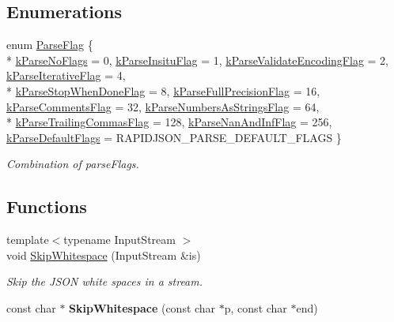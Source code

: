 \subsection*{Enumerations}
\begin{DoxyCompactItemize}
\item 
enum \hyperlink{a00683_ab7be7dabe6ffcba60fad441505583450}{Parse\+Flag} \{ \\*
\hyperlink{a00683_ab7be7dabe6ffcba60fad441505583450a1af603dc5f65bb815316589e782bc71a}{k\+Parse\+No\+Flags} = 0, 
\hyperlink{a00683_ab7be7dabe6ffcba60fad441505583450a13188bd483b4df0b6582bebe2aeb5b01}{k\+Parse\+Insitu\+Flag} = 1, 
\hyperlink{a00683_ab7be7dabe6ffcba60fad441505583450a9b3baa16346575d2dc072b23a88e1928}{k\+Parse\+Validate\+Encoding\+Flag} = 2, 
\hyperlink{a00683_ab7be7dabe6ffcba60fad441505583450aadb14f5a3b6b33e28055e913a2eae5e9}{k\+Parse\+Iterative\+Flag} = 4, 
\\*
\hyperlink{a00683_ab7be7dabe6ffcba60fad441505583450af77d115d3bbed0a448b6b335f3b93b36}{k\+Parse\+Stop\+When\+Done\+Flag} = 8, 
\hyperlink{a00683_ab7be7dabe6ffcba60fad441505583450a057fbeacafb16bb7d24c9998262cae46}{k\+Parse\+Full\+Precision\+Flag} = 16, 
\hyperlink{a00683_ab7be7dabe6ffcba60fad441505583450a245d1b6af730f47f0e7bd27078f5e8c1}{k\+Parse\+Comments\+Flag} = 32, 
\hyperlink{a00683_ab7be7dabe6ffcba60fad441505583450aa951ab03a51b32b60164436bc280cf01}{k\+Parse\+Numbers\+As\+Strings\+Flag} = 64, 
\\*
\hyperlink{a00683_ab7be7dabe6ffcba60fad441505583450a953d6381de950e25c8c97ad54f52370a}{k\+Parse\+Trailing\+Commas\+Flag} = 128, 
\hyperlink{a00683_ab7be7dabe6ffcba60fad441505583450a9849d65c1d3edd796bd75897c6a37eb6}{k\+Parse\+Nan\+And\+Inf\+Flag} = 256, 
\hyperlink{a00683_ab7be7dabe6ffcba60fad441505583450a9104b0946d648e9467cb7a967401ec80}{k\+Parse\+Default\+Flags} = R\+A\+P\+I\+D\+J\+S\+O\+N\+\_\+\+P\+A\+R\+S\+E\+\_\+\+D\+E\+F\+A\+U\+L\+T\+\_\+\+F\+L\+A\+GS
 \}\begin{DoxyCompactList}\small\item\em Combination of parse\+Flags. \end{DoxyCompactList}
\end{DoxyCompactItemize}
\subsection*{Functions}
\begin{DoxyCompactItemize}
\item 
{\footnotesize template$<$typename Input\+Stream $>$ }\\void \hyperlink{a00683_a60338858b2582eca23f3e509a2d82e0e}{Skip\+Whitespace} (Input\+Stream \&is)
\begin{DoxyCompactList}\small\item\em Skip the J\+S\+ON white spaces in a stream. \end{DoxyCompactList}\item 
const char $\ast$ {\bfseries Skip\+Whitespace} (const char $\ast$p, const char $\ast$end)\hypertarget{a00683_a64051745304fce07e8b95a71776bab92}{}\label{a00683_a64051745304fce07e8b95a71776bab92}

\end{DoxyCompactItemize}


